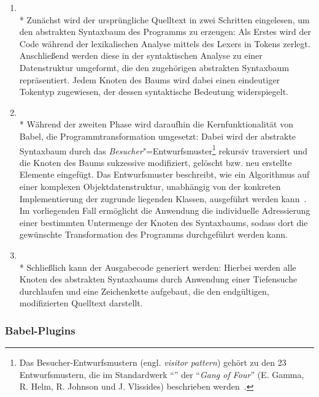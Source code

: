 \begin{enumerate}
  \item {}\\*
    Zunächst wird der ursprüngliche Quelltext in zwei Schritten eingelesen, um den abstrakten Syntaxbaum des Programms zu erzeugen: Als Erstes wird der Code während der lexikalischen Analyse mittels des Lexers in Tokens zerlegt. Anschließend werden diese in der syntaktischen Analyse zu einer Datenstruktur umgeformt, die den zugehörigen abstrakten Syntaxbaum repräsentiert. Jedem Knoten des Baums wird dabei einen eindeutiger Tokentyp zugewiesen, der dessen syntaktische Bedeutung widerspiegelt.
    \bigbreak
  \item {}\\*
    Während der zweiten Phase wird daraufhin die Kernfunktionalität von Babel, die Programmtransformation umgesetzt: Dabei wird der abstrakte Syntaxbaum durch das \emph{Besucher}"=Entwurfsmuster\footnote{Das Besucher-Entwurfsmustern (engl. \textit{visitor pattern}) gehört zu den 23 Entwurfsmustern, die im Standardwerk \enquote{} der \enquote{\textit{Gang of Four}} (E. Gamma, R. Helm, R. Johnson und J. Vlissides) beschrieben werden~\autocite[306\psqq]{GAMMA:1994}.} rekursiv traversiert und die Knoten des Baums sukzessive modifiziert, gelöscht bzw. neu erstellte Elemente eingefügt. Das Entwurfsmuster beschreibt, wie ein Algorithmus auf einer komplexen Objektdatenstruktur, unabhängig von der konkreten Implementierung der zugrunde liegenden Klassen, ausgeführt werden kann~\autocite[634\psq]{FREEMAN:2004}. Im vorliegenden Fall ermöglicht die Anwendung die individuelle Adressierung einer bestimmten Untermenge der Knoten des Syntaxbaums, sodass dort die gewünschte Transformation des Programms durchgeführt werden kann.
    \bigbreak
  \item {}\\*
    Schließlich kann der Ausgabecode generiert werden: Hierbei werden alle Knoten des abstrakten Syntaxbaums durch Anwendung einer Tiefensuche durchlaufen und eine Zeichenkette aufgebaut, die den endgültigen, modifizierten Quelltext darstellt.
\end{enumerate}

\subsubsection{Babel-Plugins}
\label{sec:babel-plugins}

